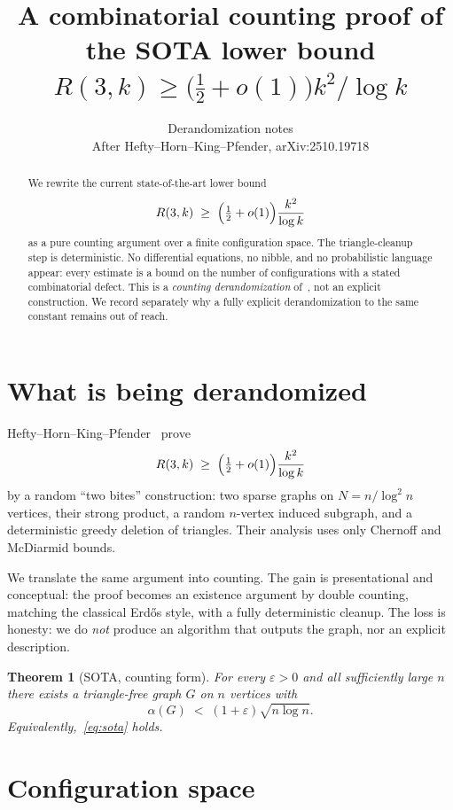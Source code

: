 \documentclass[11pt]{article}
\title{A combinatorial counting proof of the SOTA lower bound\\
$R(3,k)\ge\bigl(\tfrac12+o(1)\bigr)k^{2}/\log k$}
\author{Derandomization notes\\[0.4em]
\large After Hefty--Horn--King--Pfender, arXiv:2510.19718}
\date{}
\newtheorem{theorem}{Theorem}
\theoremstyle{definition}
\newcommand{\eps}{\varepsilon}
\begin{document}
\maketitle

\begin{abstract}
We rewrite the current state-of-the-art lower bound
\[
  R(3,k)\;\ge\;\Bigl(\tfrac12+o(1)\Bigr)\frac{k^{2}}{\log k}
\]
as a pure counting argument over a finite configuration space.
The triangle-cleanup step is deterministic.
No differential equations, no nibble, and no probabilistic language appear:
every estimate is a bound on the number of configurations with a stated combinatorial defect.
This is a \emph{counting derandomization} of~\cite{HHKP2025}, not an explicit construction.
We record separately why a fully explicit derandomization to the same constant remains out of reach.
\end{abstract}

\section{What is being derandomized}

Hefty--Horn--King--Pfender~\cite{HHKP2025} prove
\begin{equation}\label{eq:sota}
  R(3,k)\;\ge\;\Bigl(\tfrac12+o(1)\Bigr)\frac{k^{2}}{\log k}
\end{equation}
by a random ``two bites'' construction: two sparse graphs on $N=n/\log^{2}n$ vertices, their strong product, a random $n$-vertex induced subgraph, and a deterministic greedy deletion of triangles.
Their analysis uses only Chernoff and McDiarmid bounds.

We translate the same argument into counting.
The gain is presentational and conceptual: the proof becomes an existence argument by double counting, matching the classical Erd\H{o}s style, with a fully deterministic cleanup.
The loss is honesty: we do \emph{not} produce an algorithm that outputs the graph, nor an explicit description.

\begin{theorem}[SOTA, counting form]\label{thm:main}
For every $\eps>0$ and all sufficiently large $n$ there exists a triangle-free graph $G$ on $n$ vertices with
\[
  \alpha(G)\;<\;(1+\eps)\sqrt{n\log n}.
\]
Equivalently,~\eqref{eq:sota} holds.
\end{theorem}

\section{Configuration space}
\end{document}
